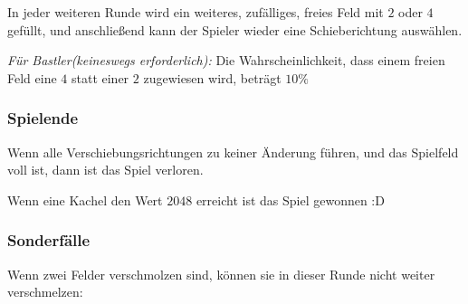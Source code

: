 \documentclass[ngerman,accentcolor=3c,colorbacktitle,12pt,T1]{tudaexercise}
\begin{document}
\begin{minipage}[t]{.3\textwidth}%
    \centering%
    \captionsetup{type=figure}
\end{minipage}%

In jeder weiteren Runde wird ein weiteres, zufälliges, freies Feld mit $2$ oder $4$ gefüllt, und anschließend kann der Spieler wieder eine Schieberichtung auswählen.

\textit{Für Bastler(keineswegs erforderlich):} Die Wahrscheinlichkeit, dass einem freien Feld eine $4$ statt einer $2$ zugewiesen wird, beträgt $10\%$
\vspace{-1ex}
\subsubsection*{Spielende}
Wenn alle Verschiebungsrichtungen zu keiner Änderung führen, und das Spielfeld voll ist, dann ist das Spiel verloren.

Wenn eine Kachel den Wert $2048$ erreicht ist das Spiel gewonnen :D
\vspace{-1ex}
\subsubsection*{Sonderfälle}

Wenn zwei Felder verschmolzen sind, können sie in dieser Runde nicht weiter verschmelzen:
\end{document}
